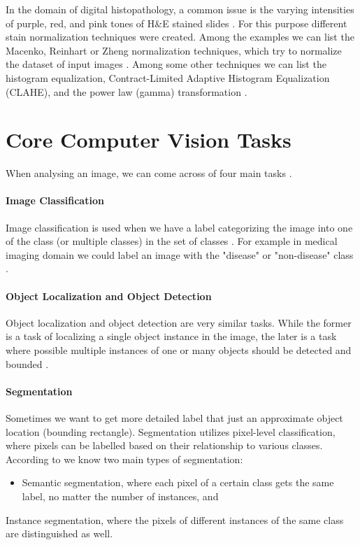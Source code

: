 In the domain of digital histopathology, a common issue is the varying intensities of purple, red, and pink tones of H\&E stained slides \cite{Hoque2024}. For this purpose different stain normalization techniques were created. Among the examples we can list the Macenko, Reinhart or Zheng normalization techniques, which try to normalize the dataset of input images \cite{Hoque2024}. Among some other techniques we can list the histogram equalization, Contract-Limited Adaptive Histogram Equalization (CLAHE), and the power law (gamma) transformation \cite{Dabass2020}.

\section{Core Computer Vision Tasks}
When analysing an image, we can come across of four main tasks \cite{Alam2021}.

\paragraph{Image Classification}
Image classification is used when we have a label categorizing the image into one of the class (or multiple classes) in the set of classes \cite{Alam2021}. For example in medical imaging domain we could label an image with the "disease" or "non-disease" class .

\paragraph{Object Localization and Object Detection}
Object localization and object detection are very similar tasks. While the former is a task of localizing a single object instance in the image, the later is a task where possible multiple instances of one or many objects should be detected and bounded \cite{Alam2021}.

\paragraph{Segmentation} Sometimes we want to get more detailed label that just an approximate object location (bounding rectangle). Segmentation utilizes pixel-level classification, where pixels can be labelled based on their relationship to various classes. According to \cite{Alam2021} we know two main types of segmentation:

\begin{itemize}
    \item Semantic segmentation, where each pixel of a certain class gets the same label, no matter the number of instances, and
\end{itemize} Instance segmentation, where the pixels of different instances of the same class are distinguished as well.

